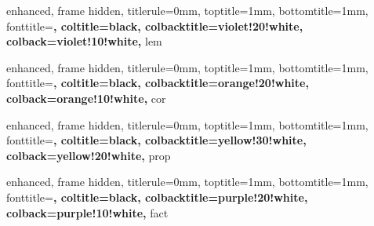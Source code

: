 {
    enhanced, frame hidden, titlerule=0mm, toptitle=1mm, bottomtitle=1mm,
    fonttitle=\bfseries\large, coltitle=black,
    colbacktitle=violet!20!white, colback=violet!10!white,
}{lem}


\newenvironment{lempf}{
	{\noindent{\it \textbf{引理的证明}}}
	\tcolorbox[blanker,breakable,left=5mm,parbox=false,top=8pt,
    before upper={\parindent15pt}, after skip=10pt,
	borderline west={1mm}{0pt}{violet!20!white}]
}{
    \textcolor{violet!20!white}{\hbox{}\nobreak\hfill$\blacksquare$}
    \endtcolorbox
}

{
    enhanced, frame hidden, titlerule=0mm, toptitle=1mm, bottomtitle=1mm,
    fonttitle=\bfseries\large, coltitle=black,
    colbacktitle=orange!20!white, colback=orange!10!white,
}{cor}


{
    enhanced, frame hidden, titlerule=0mm, toptitle=1mm, bottomtitle=1mm,
    fonttitle=\bfseries\large, coltitle=black,
    colbacktitle=yellow!30!white, colback=yellow!20!white,
}{prop}


{
    enhanced, frame hidden, titlerule=0mm, toptitle=1mm, bottomtitle=1mm,
    fonttitle=\bfseries\large, coltitle=black,
    colbacktitle=purple!20!white, colback=purple!10!white,
}{fact}



